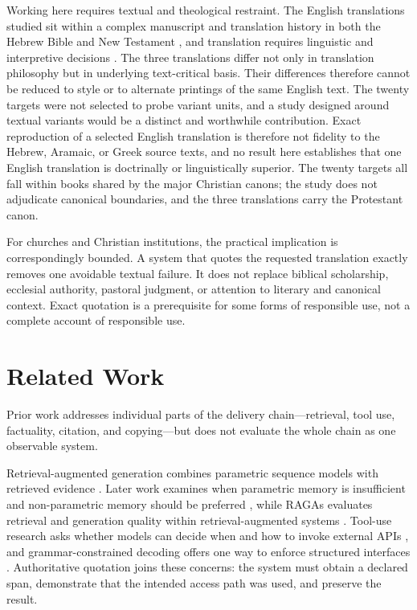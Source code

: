 \documentclass[11pt]{article}
\begin{document}
Working here requires textual and theological restraint. The English translations
studied sit within a complex manuscript and translation history in both the
Hebrew Bible and New Testament \citep{tov2012textual,metzger2005text}, and
translation requires linguistic and interpretive decisions
\citep{nida1969theory}. The three translations differ not only in translation
philosophy but in underlying text-critical basis. Their differences therefore
cannot be reduced to style or to alternate printings of the same English text.
The twenty targets were not selected to probe variant units, and a
study designed around textual variants would be a distinct and worthwhile
contribution. Exact reproduction of a selected English translation is therefore not
fidelity to the Hebrew, Aramaic, or Greek source texts, and no result here
establishes that one English translation is doctrinally or linguistically
superior. The twenty targets all fall within books shared by the major
Christian canons; the study does not adjudicate canonical boundaries, and the
three translations carry the Protestant canon.

For churches and Christian institutions, the practical implication is
correspondingly bounded. A system that quotes the requested translation exactly
removes one avoidable textual failure. It does not replace biblical
scholarship, ecclesial authority, pastoral judgment, or attention to literary
and canonical context. Exact quotation is a prerequisite for some forms of
responsible use, not a complete account of responsible use.

\section{Related Work}
\label{sec:related-work}

Prior work addresses individual parts of the delivery chain---retrieval, tool
use, factuality, citation, and copying---but does not evaluate the whole chain
as one observable system.

Retrieval-augmented generation combines parametric sequence models with
retrieved evidence \citep{lewis2020retrieval}. Later work examines when
parametric memory is insufficient and non-parametric memory should be preferred
\citep{mallen2023when}, while RAGAs evaluates retrieval and generation quality
within retrieval-augmented systems \citep{es2024ragas}. Tool-use research asks
whether models can decide when and how to invoke external APIs
\citep{schick2023toolformer,ross2025when2call}, and grammar-constrained
decoding offers one way to enforce structured interfaces
\citep{geng2023grammar}. Authoritative quotation joins these concerns: the
system must obtain a declared span, demonstrate that the intended access path
was used, and preserve the result.
\end{document}
